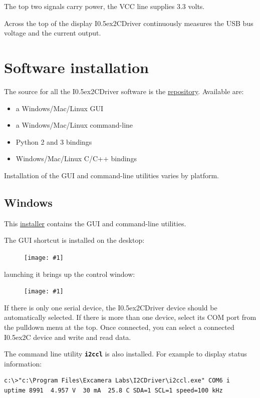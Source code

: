 \documentclass{article}
\newcommand{\two}{\raise0.5ex\hbox{\footnotesize{2}}}
\newcommand{\iic}{I\two{}C}
\newcommand{\iicdriver}{I\two{}CDriver}
\newcommand{\pngw}[2]{
\begin{figure}[H]
\begin{center}
\texttt{[image: \#1]}
\end{center}
\end{figure}
}
\newcommand{\mach}[1]{\texttt{\textbf{#1}}}
\begin{document}
The top two signals carry power, the VCC line supplies 3.3 volts.

Across the top of the display \iicdriver{} continuously measures the USB bus voltage
and the current output.

\newpage
\section{Software installation}

The source for all the \iicdriver{} software is the
\href{https://github.com/jamesbowman/i2cdriver}{repository}.
Available are:

\begin{itemize}
\item a Windows/Mac/Linux GUI
\item a Windows/Mac/Linux command-line
\item Python 2 and 3 bindings
\item Windows/Mac/Linux C/C++ bindings
\end{itemize}

Installation of the GUI and command-line utilities varies by platform.

\subsection{Windows}

This
\href{https://spidriver.com/windows}{installer}
contains the GUI and command-line utilities.

The GUI shortcut is installed on the desktop:

\pngw{img/i2cdriver/win32-icon}{.3}

launching it brings up the control window:

\pngw{img/i2cdriver/win32-gui}{.75}

If there is only one serial device, 
the \iicdriver{} device should be automatically selected.
If there is more than one device, select its COM port from the pulldown menu at the top.
Once connected, you can select a connected \iic{} device and write and read data. 

The command line utility \mach{i2ccl} is also installed. For example to display status information:

\begin{lstlisting}
c:\>"c:\Program Files\Excamera Labs\I2CDriver\i2ccl.exe" COM6 i
uptime 8991  4.957 V  30 mA  25.8 C SDA=1 SCL=1 speed=100 kHz
\end{lstlisting}
\end{document}
